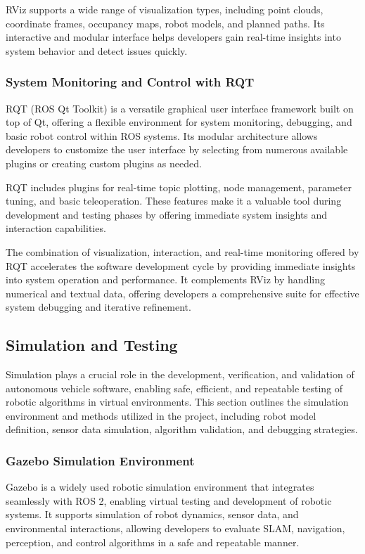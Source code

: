 \documentclass[english,project]{buwthesis}
\begin{document}
RViz supports a wide range of visualization types, including point clouds, coordinate frames, occupancy maps, robot models, and planned paths. Its interactive and modular interface helps developers gain real-time insights into system behavior and detect issues quickly.

\subsubsection{System Monitoring and Control with RQT}
RQT (ROS Qt Toolkit) is a versatile graphical user interface framework built on top of Qt, offering a flexible environment for system monitoring, debugging, and basic robot control within ROS systems. Its modular architecture allows developers to customize the user interface by selecting from numerous available plugins or creating custom plugins as needed.

RQT includes plugins for real-time topic plotting, node management, parameter tuning, and basic teleoperation. These features make it a valuable tool during development and testing phases by offering immediate system insights and interaction capabilities.

The combination of visualization, interaction, and real-time monitoring offered by RQT accelerates the software development cycle by providing immediate insights into system operation and performance. It complements RViz by handling numerical and textual data, offering developers a comprehensive suite for effective system debugging and iterative refinement.

\subsection{Simulation and Testing}
Simulation plays a crucial role in the development, verification, and validation of autonomous vehicle software, enabling safe, efficient, and repeatable testing of robotic algorithms in virtual environments. This section outlines the simulation environment and methods utilized in the project, including robot model definition, sensor data simulation, algorithm validation, and debugging strategies.
\subsubsection{Gazebo Simulation Environment}

Gazebo is a widely used robotic simulation environment that integrates seamlessly with ROS 2, enabling virtual testing and development of robotic systems. It supports simulation of robot dynamics, sensor data, and environmental interactions, allowing developers to evaluate SLAM, navigation, perception, and control algorithms in a safe and repeatable manner.
\end{document}
